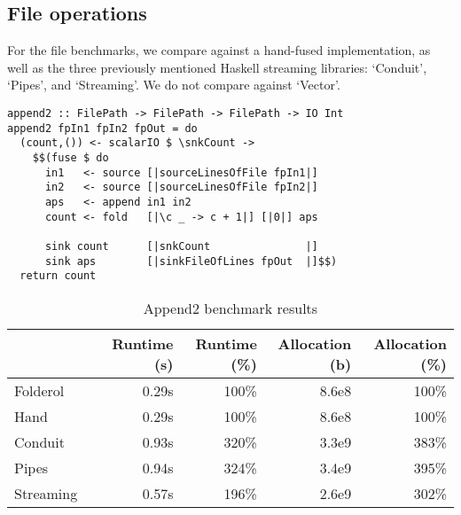 \subsection{File operations}
For the file benchmarks, we compare against a hand-fused implementation, as well as the three previously mentioned Haskell streaming libraries: `Conduit', `Pipes', and `Streaming'.
We do not compare against `Vector'.

\begin{lstlisting}[float,label=l:bench:append2Folderol,caption=Folderol implementation of append2]
append2 :: FilePath -> FilePath -> FilePath -> IO Int
append2 fpIn1 fpIn2 fpOut = do
  (count,()) <- scalarIO $ \snkCount ->
    $$(fuse $ do
      in1   <- source [|sourceLinesOfFile fpIn1|]
      in2   <- source [|sourceLinesOfFile fpIn2|]
      aps   <- append in1 in2
      count <- fold   [|\c _ -> c + 1|] [|0|] aps

      sink count      [|snkCount               |]
      sink aps        [|sinkFileOfLines fpOut  |]$$)
  return count
\end{lstlisting}
\begin{table}
\begin{center}
\begin{tabular}{ll|rrrr}
& & Runtime (s)  & Runtime (\%) & Allocation (b) & Allocation (\%) \\
\hline
Folderol &          & 0.29s &   100\% & 8.6e8 & 100\% \\
Hand     &          & 0.29s &   100\% & 8.6e8 & 100\% \\
Conduit &           & 0.93s &   320\% & 3.3e9 & 383\% \\
Pipes  &            & 0.94s &   324\% & 3.4e9 & 395\% \\
Streaming &         & 0.57s &   196\% & 2.6e9 & 302\% \\
\end{tabular}
\end{center}
\caption[Append2 benchmark results]{Append2 benchmark results}
\label{table:bench:append2}
\end{table}


